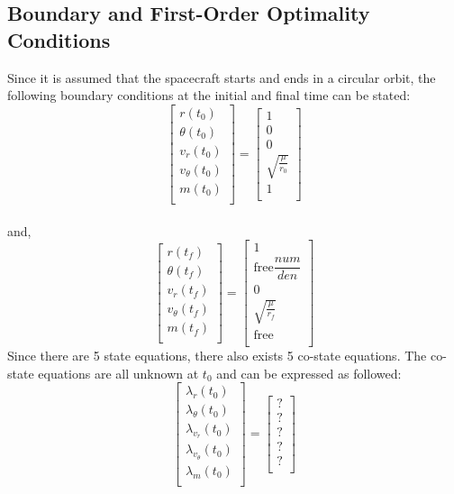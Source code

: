 \documentclass[]{article}
\begin{document}
\subsection{Boundary and First-Order Optimality Conditions}
Since it is assumed that the spacecraft starts and ends in a circular orbit, the following boundary conditions at the initial and final time can be stated:
\[
\begin{bmatrix}
	r(t_0)\\
	\theta(t_0)\\
	v_r(t_0)\\
	v_{\theta}(t_0)\\
	m(t_0)\\
\end{bmatrix}
=
\begin{bmatrix}
	1\\
	0\\
	0\\
	\sqrt{\frac{\mu}{r_0}}\\
	1\\
\end{bmatrix}
\]\\
and,
\[
\begin{bmatrix}
	r(t_f)\\
	\theta(t_f)\\
	v_r(t_f)\\
	v_{\theta}(t_f)\\
	m(t_f)\\
\end{bmatrix}
=
\begin{bmatrix}
	1\\
	\mathrm{free}\dfrac{num}{den}\\
	0\\
	\sqrt{\frac{\mu}{r_f}}\\
	\mathrm{free}\\
\end{bmatrix}
\]
Since there are 5 state equations, there also exists 5 co-state equations. The co-state equations are all unknown at \(t_0\) and can be expressed as followed:
\[
\begin{bmatrix}
	\lambda_{r}(t_0)\\
	\lambda_{\theta}(t_0)\\
	\lambda_{v_r}(t_0)\\
	\lambda_{v_{\theta}}(t_0)\\
	\lambda_{m}(t_0)\\
\end{bmatrix}
=
\begin{bmatrix}
	?\\
	?\\
	?\\
	?\\
	?\\
\end{bmatrix}
\]
\end{document}
